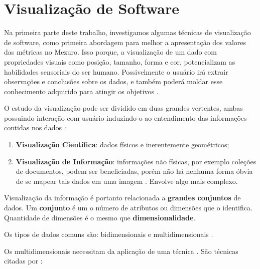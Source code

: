 \chapter{Visualização de Software}\label{chap:visualizacao}

Na primeira parte deste trabalho, investigamos algumas técnicas de visualização
de software, como primeira abordagem para melhor a apresentação dos valores das
métricas no Mezuro. Isso porque, a visualização de um dado com propriedades
visuais como posição, tamanho, forma e cor, potencializam as habilidades
sensoriais do ser humano. Possivelmente o usuário irá extrair observações e
conclusões sobre os dados, e também poderá moldar esse conhecimento adquirido
para atingir os objetivos \cite{card1999readings} \cite{heer2012interactive}
\cite{keim2002information}.

O estudo da visualização pode ser dividido em duas grandes vertentes, ambas
possuindo interação com usuário induzindo-o ao entendimento das informações
contidas nos dados \cite{de2003visual}:

\begin{enumerate}
  \item \textbf{Visualização Científica}: dados físicos e inerentemente
  geométricos;
  \item \textbf{Visualização de Informação}: informações não físicas, por
  exemplo coleções de documentos, podem ser beneficiadas, porém não há nenhuma
  forma óbvia de se mapear tais dados em uma imagem \cite{card1999readings}.
  Envolve algo mais complexo.
\end{enumerate}

Visualização da informação é portanto relacionada a \textbf{grandes conjuntos}
de dados. Um \textbf{conjunto} é um o número de atributos ou dimensões que o
identifica. Quantidade de dimensões é o mesmo que \textbf{dimensionalidade}.

Os tipos de dados comuns são: bidimensionais e multidimensionais
\cite{de2003visual}.

Os multidimensionais necessitam da aplicação de uma técnica
\cite{keim2002information}. São técnicas citadas por :

